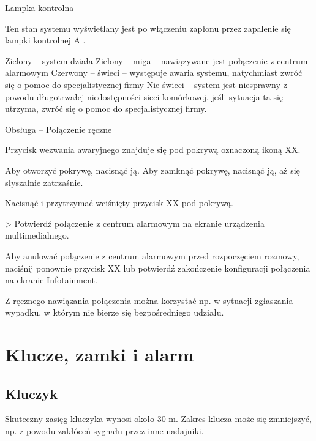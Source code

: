 Lampka kontrolna

Ten stan systemu wyświetlany jest po włączeniu zapłonu przez zapalenie się lampki kontrolnej A .
\begin{itemizeTriangle}
	\itemTriangle Zielony – system działa
	\itemTriangle Zielony – miga – nawiązywane jest połączenie z centrum alarmowym
	\itemTriangle Czerwony – świeci – występuje awaria systemu, natychmiast zwróć się o pomoc do specjalistycznej firmy
	\itemTriangle Nie świeci – system jest niesprawny z powodu długotrwałej niedostępności sieci komórkowej, jeśli sytuacja ta się utrzyma, zwróć się o pomoc do specjalistycznej firmy.
\end{itemizeTriangle}

Obsługa -- Połączenie ręczne

Przycisk wezwania awaryjnego znajduje się pod pokrywą oznaczoną ikoną XX.

\begin{itemizeArrow}
	\itemArrow Aby otworzyć pokrywę, nacisnąć ją.
	\itemArrow Aby zamknąć pokrywę, nacisnąć ją, aż się słyszalnie zatrzaśnie.
\end{itemizeArrow}

\begin{itemizeArrow}
	\itemArrow Nacisnąć i przytrzymać wciśnięty przycisk XX pod pokrywą.
\end{itemizeArrow}
> Potwierdź połączenie z centrum alarmowym na ekranie urządzenia multimedialnego.
\begin{itemizeArrow}
	\itemArrow Aby anulować połączenie z centrum alarmowym przed rozpoczęciem rozmowy, naciśnij ponownie przycisk XX lub potwierdź zakończenie konfiguracji połączenia na ekranie Infotainment.
\end{itemizeArrow}

Z ręcznego nawiązania połączenia można korzystać np. w sytuacji zgłaszania wypadku, w którym nie bierze się bezpośredniego udziału.


\section{Klucze, zamki i alarm}

\subsection{Kluczyk}

Skuteczny zasięg kluczyka wynosi około 30 m.
Zakres klucza może się zmniejszyć, np. z powodu zakłóceń sygnału przez inne nadajniki.

